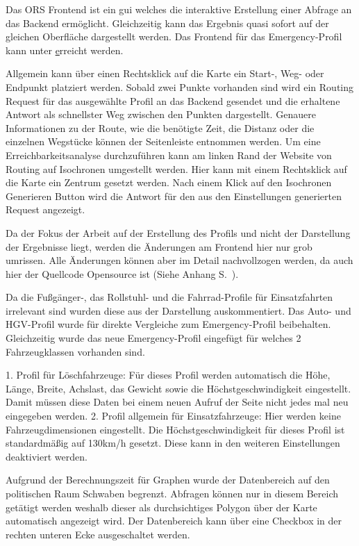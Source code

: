 Das ORS Frontend ist ein \gls{gui} welches die interaktive Erstellung einer Abfrage an das Backend ermöglicht. Gleichzeitig kann das Ergebnis quasi sofort auf der gleichen Oberfläche dargestellt werden. Das Frontend für das Emergency-Profil kann unter \href{www.emergency.openrouteservice.org} erreicht werden.

\bigskip

Allgemein kann über einen Rechtsklick auf die Karte ein Start-, Weg- oder Endpunkt platziert werden. Sobald zwei Punkte vorhanden sind wird ein Routing Request für das ausgewählte Profil an das Backend gesendet und die erhaltene Antwort als schnellster Weg zwischen den Punkten dargestellt. Genauere Informationen zu der Route, wie die benötigte Zeit, die Distanz oder die einzelnen Wegstücke können der Seitenleiste entnommen werden.
Um eine Erreichbarkeitsanalyse durchzuführen kann am linken Rand der Website von Routing auf Isochronen umgestellt werden. Hier kann mit einem Rechtsklick auf die Karte ein Zentrum gesetzt werden. Nach einem Klick auf den Isochronen Generieren Button wird die Antwort für den aus den Einstellungen generierten Request angezeigt.

\bigskip

Da der Fokus der Arbeit auf der Erstellung des Profils und nicht der Darstellung der Ergebnisse liegt, werden die Änderungen am Frontend hier nur grob umrissen. Alle Änderungen können aber im Detail nachvollzogen werden, da auch hier der Quellcode Opensource ist (Siehe Anhang S.~\pageref{sec:anhang}).

\bigskip

Da die Fußgänger-, das Rollstuhl- und die Fahrrad-Profile für Einsatzfahrten irrelevant sind wurden diese aus der Darstellung auskommentiert. Das Auto- und HGV-Profil wurde für direkte Vergleiche zum Emergency-Profil beibehalten.
Gleichzeitig wurde das neue Emergency-Profil eingefügt für welches 2 Fahrzeugklassen vorhanden sind.

\bigskip

1. Profil für Löschfahrzeuge: Für dieses Profil werden automatisch die Höhe, Länge, Breite, Achslast, das Gewicht sowie die Höchstgeschwindigkeit eingestellt. Damit müssen diese Daten bei einem neuen Aufruf der Seite nicht jedes mal neu eingegeben werden. 
2. Profil allgemein für Einsatzfahrzeuge: Hier werden keine Fahrzeugdimensionen eingestellt. Die Höchstgeschwindigkeit für dieses Profil ist standardmäßig auf 130km/h gesetzt. Diese kann in den weiteren Einstellungen deaktiviert werden.

\bigskip

Aufgrund der Berechnungszeit für Graphen wurde der Datenbereich auf den politischen Raum Schwaben begrenzt. Abfragen können nur in diesem Bereich getätigt werden weshalb dieser als durchsichtiges Polygon über der Karte automatisch angezeigt wird. Der Datenbereich kann über eine Checkbox in der rechten unteren Ecke ausgeschaltet werden.
